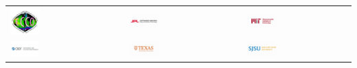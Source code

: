 \pagebreak
\begin{center}
\begin{tabular}{m{} m{} m{} m{} m{}}
    \includegraphics[width=0.3\textwidth]{../images/ecco_logo_800_726.png} & & \includegraphics[width=0.3\textwidth]{../images/logo_jpl.png} & & \includegraphics[width=0.3\textwidth]{../images/logo_mit.png}\\ 

    \includegraphics[width=0.3\textwidth]{../images/logo_aer.png} & & \includegraphics[width=0.3\textwidth]{../images/logo_uta.png} & & \includegraphics[width=0.3\textwidth]{../images/ecco_teams_sjsu.png}\\

    

\end{tabular}
\end{center}
